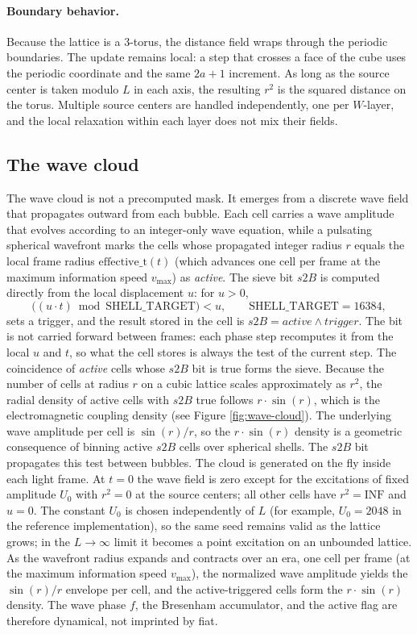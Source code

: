\documentclass[a4paper]{article}
\begin{document}
\paragraph{Boundary behavior.}
Because the lattice is a 3-torus, the distance field wraps through the periodic boundaries.  The update remains local: a step that crosses a face of the cube uses the periodic coordinate and the same $2a+1$ increment.  As long as the source center is taken modulo $L$ in each axis, the resulting $r^{2}$ is the squared distance on the torus.  Multiple source centers are handled independently, one per $W$-layer, and the local relaxation within each layer does not mix their fields.
\subsection{The wave cloud}\label{subsec:Sine}
The wave cloud is not a precomputed mask. It emerges from a discrete wave field that propagates outward from each bubble. Each cell carries a wave amplitude that evolves according to an integer-only wave equation, while a pulsating spherical wavefront marks the cells whose propagated integer radius $r$ equals the local frame radius $\mathrm{effective\_t}(t)$ (which advances one cell per frame at the maximum information speed $v_{\max}$) as \emph{active}. The sieve bit $s2B$ is computed directly from the local displacement $u$: for $u>0$,
\[
\bigl((u \cdot t) \bmod \mathrm{SHELL\_TARGET}\bigr) < u,
\qquad \mathrm{SHELL\_TARGET}=16384,
\]
sets a trigger, and the result stored in the cell is $s2B = \mathit{active} \land \mathit{trigger}$. The bit is not carried forward between frames: each phase step recomputes it from the local $u$ and $t$, so what the cell stores is always the test of the current step. The coincidence of \emph{active} cells whose $s2B$ bit is true forms the sieve.
Because the number of cells at radius $r$ on a cubic lattice scales approximately as $r^{2}$, the radial density of active cells with $s2B$ true follows $r\cdot\sin(r)$, which is the electromagnetic coupling density (see Figure \ref{fig:wave-cloud}). The underlying wave amplitude per cell is $\sin(r)/r$, so the $r\cdot\sin(r)$ density is a geometric consequence of binning active $s2B$ cells over spherical shells. The $s2B$ bit propagates this test between bubbles.
The cloud is generated on the fly inside each light frame.  At $t=0$ the wave field is zero except for the excitations of fixed amplitude $U_{0}$ with $r^{2}=0$ at the source centers; all other cells have $r^{2}=\mathrm{INF}$ and $u=0$.  The constant $U_{0}$ is chosen independently of $L$ (for example, $U_{0}=2048$ in the reference implementation), so the same seed remains valid as the lattice grows; in the $L\to\infty$ limit it becomes a point excitation on an unbounded lattice.  As the wavefront radius expands and contracts over an era, one cell per frame (at the maximum information speed $v_{\max}$), the normalized wave amplitude yields the $\sin(r)/r$ envelope per cell, and the active-triggered cells form the $r\cdot\sin(r)$ density.  The wave phase $f$, the Bresenham accumulator, and the active flag are therefore dynamical, not imprinted by fiat.
\end{document}
